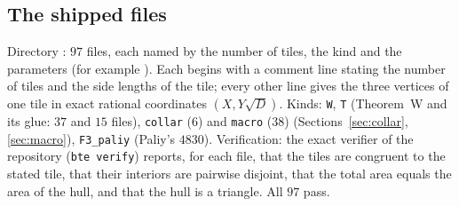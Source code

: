 \documentclass[11pt,reqno]{amsart}
\theoremstyle{plain}
\theoremstyle{definition}
\begin{document}
\subsection{The shipped files}
Directory : $97$ files, each named by the number of tiles, the kind and the parameters (for example ). Each begins with a comment line stating the number of tiles and the side lengths of the tile; every other line gives the three vertices of one tile in exact rational coordinates $(X,Y\sqrt D)$. Kinds: \texttt{W}, \texttt{T} (Theorem~W and its glue: $37$ and $15$ files), \texttt{collar} ($6$) and \texttt{macro} ($38$) (Sections~\ref{sec:collar}, \ref{sec:macro}), \texttt{F3\_paliy} (Paliy's $4830$). Verification: the exact verifier of the repository (\texttt{bte verify}) reports, for each file, that the tiles are congruent to the stated tile, that their interiors are pairwise disjoint, that the total area equals the area of the hull, and that the hull is a triangle. All $97$ pass.
\end{document}
